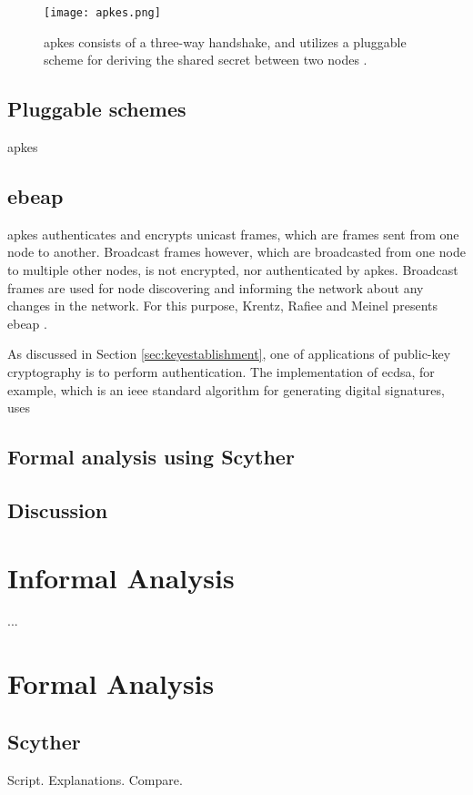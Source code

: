 \begin{figure}[h]
	\centering
	\texttt{[image: apkes.png]}
	\caption{\gls{apkes} consists of a three-way handshake, and utilizes a pluggable scheme for deriving the shared secret between two nodes \cite{krentz20136lowpan}.}
	\label{fig:apkes}
\end{figure}

\subsection{Pluggable schemes}

\gls{apkes} 

\subsection{\gls{ebeap}}

\gls{apkes} authenticates and encrypts unicast frames, which are frames sent from one node to another. Broadcast frames however, which are broadcasted from one node to multiple other nodes, is not encrypted, nor authenticated by \gls{apkes}. Broadcast frames are used for node discovering and informing the network about any changes in the network. For this purpose, Krentz, Rafiee and Meinel presents \gls{ebeap} \cite{krentz20136lowpan}.


As discussed in Section \ref{sec:keyestablishment}, one of applications of public-key cryptography is to perform authentication. The implementation of \gls{ecdsa}, for example, which is an \gls{ieee} standard algorithm for generating digital signatures, uses 
\subsection{Formal analysis using Scyther}

\subsection{Discussion}




\section{Informal Analysis}

...

\section{Formal Analysis}

\subsection{Scyther}


Script. Explanations. Compare.










